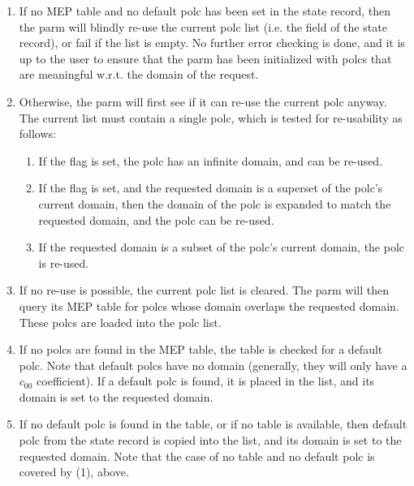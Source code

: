 \documentclass[10pt,twoside]{book}
\begin{document}
  \begin{enumerate}
  
  \item If no MEP table and no default polc has been set in the state record,
    then the parm will blindly re-use the current polc list (i.e. the
     field of the state record), or fail if the list is empty.  No
    further error checking is done, and it is up to the user to ensure that the
    parm has been initialized with polcs that are meaningful w.r.t. the domain
    of the request.

  \item Otherwise, the parm will first see if it can re-use the current polc 
    anyway. The current list must contain a single polc, which is tested for
    re-usability as follows:

    \begin{enumerate}
    
    \item If the  flag is set, the polc has an infinite domain, 
      and can be re-used.
      
    \item If the  flag is set, and the requested domain is a
      superset of the polc's current domain, then the domain of the polc is
      expanded to match the requested domain, and the polc can be re-used. 

    \item If the requested domain is a subset of the polc's current domain, the
      polc is re-used.

    \end{enumerate}

  \item If no re-use is possible, the current polc list is cleared. The parm
    will then query its MEP table for polcs whose domain overlaps the requested
    domain. These polcs are loaded into the polc list.

  \item If no polcs are found in the MEP table, the table is checked for a
    default polc. Note that default polcs have no domain (generally, they will
    only have a $c_{00}$ coefficient). If a default polc is found, it is placed
    in the list, and its domain is set to the requested domain.

  \item If no default polc is found in the table, or if no table is available,
    then default polc from the state record is copied into the list, and its
    domain is set to the requested domain. Note that the case of no table and
    no default polc is covered by (1), above.

  \end{enumerate}
  
\end{document}
